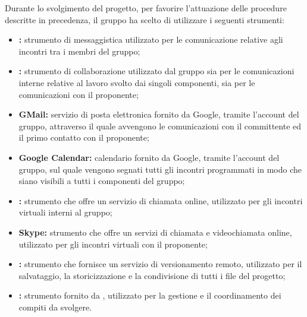 		Durante lo svolgimento del progetto, per favorire l'attuazione delle procedure descritte in precedenza, il gruppo ha scelto di utilizzare i seguenti strumenti:
		\begin{itemize}
			\item \textbf{:} strumento di messaggistica utilizzato per le comunicazione relative agli incontri tra i membri del gruppo;
			\item \textbf{:} strumento di collaborazione utilizzato dal gruppo sia per le comunicazioni interne relative al lavoro svolto dai singoli componenti, sia per le comunicazioni con il proponente;
			\item \textbf{GMail:} servizio di posta elettronica fornito da Google, tramite l'account del gruppo, attraverso il quale avvengono le comunicazioni con il committente ed il primo contatto con il proponente;
			\item \textbf{Google Calendar:} calendario fornito da Google, tramite l'account del gruppo, sul quale vengono segnati tutti gli incontri programmati in modo che siano visibili a tutti i componenti del gruppo;
			\item \textbf{:} strumento che offre un servizio di chiamata online, utilizzato per gli incontri virtuali interni al gruppo;
			\item \textbf{Skype:} strumento che offre un servizi di chiamata e videochiamata online, utilizzato per gli incontri virtuali con il proponente;
			\item \textbf{:} strumento che fornisce un servizio di versionamento remoto, utilizzato per il salvataggio, la storicizzazione e la condivisione di tutti i file del progetto;
			\item \textbf{:} strumento fornito da , utilizzato per la gestione e il coordinamento dei compiti da svolgere.
		\end{itemize}


